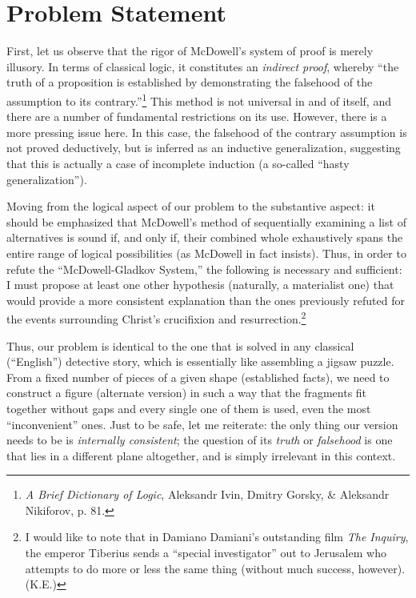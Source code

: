 \chapter*{Problem Statement}

First, let us observe that the rigor of McDowell's system of proof is merely
illusory. In terms of classical logic, it constitutes an \emph{indirect proof}, whereby ``the truth of a proposition is established by demonstrating the falsehood of the assumption to its contrary.''\footnote{\emph{A Brief Dictionary of Logic}, Aleksandr Ivin, Dmitry Gorsky, \& Aleksandr Nikiforov, p. 81.} This method is not universal in and of itself, and there are a number of fundamental restrictions on its use. However, there is a more pressing issue here. In this case, the falsehood of the contrary assumption is not proved deductively, but is inferred as an inductive generalization, suggesting that this is actually a case of incomplete induction (a so-called ``hasty generalization'').

Moving from the logical aspect of our problem to the substantive aspect: it should be emphasized that McDowell's method of sequentially examining a list of alternatives is sound if, and only if, their combined whole exhaustively spans the entire range of logical possibilities (as McDowell in fact insists). Thus, in order to refute the ``McDowell-Gladkov System,'' the following is necessary and sufficient: I must propose at least one other hypothesis (naturally, a materialist one) that would provide a more consistent explanation than the ones previously refuted for the events surrounding Christ's crucifixion and resurrection.\footnote{I would like to note that in Damiano Damiani's outstanding film \emph{The Inquiry}, the emperor Tiberius sends a ``special investigator'' out to Jerusalem who attempts to do more or less the same thing (without much success, however). (K.E.)}

Thus, our problem is identical to the one that is solved in any classical (``English'') detective story, which is essentially like assembling a jigsaw puzzle. From a fixed number of pieces of a given shape (established facts), we need to construct a figure (alternate version) in such a way that the fragments fit together without gaps and every single one of them is used, even the most ``inconvenient'' ones. Just to be safe, let me reiterate: the only thing our version needs to be is \emph{internally consistent}; the question of its \emph{truth} or \emph{falsehood} is one that lies in a different plane altogether, and is simply irrelevant in this context.

